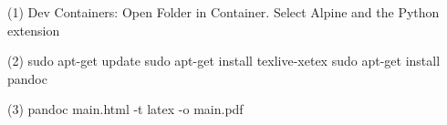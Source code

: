 (1) Dev Containers: Open Folder in Container. Select Alpine and the Python extension

(2)
sudo apt-get update
sudo apt-get install texlive-xetex
sudo apt-get install pandoc

(3)
pandoc main.html -t latex -o main.pdf